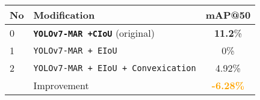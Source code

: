   \begin{tabular}{ l l c }
    \toprule[1.5pt]
    No & Modification        &mAP@50 \\
    \midrule
    0  & \texttt{\textbf{YOLOv7-MAR +CIoU}} (original)     & \textbf{11.2}\%\\
    1  & \texttt{YOLOv7-MAR + EIoU}                & 0\%\\
    2  & \texttt{YOLOv7-MAR + EIoU + Convexication} & 4.92\%\\
    \midrule
       & Improvement                                & \textbf{\textcolor{orange}{-6.28\%}}\\
    \bottomrule[1.5pt]
  \end{tabular}